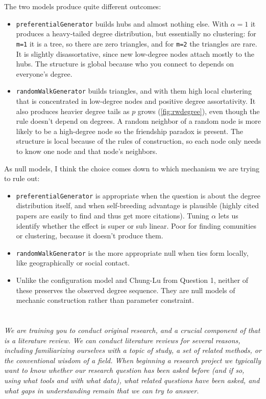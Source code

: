 \documentclass{article}
\begin{document}
\begin{enumerate}[label=(\roman*)]
    The two models produce quite different outcomes:
    \begin{itemize}
        \item \texttt{preferentialGenerator} builds hubs and almost nothing else. With $\alpha=1$ it produces a heavy-tailed degree distribution, but essentially no clustering: for \texttt{m=1} it is a tree, so there are zero triangles, and for \texttt{m=2} the triangles are rare. It is slightly disassortative, since new low-degree nodes attach mostly to the hubs. The structure is global because who you connect to depends on everyone's degree.
        \item \texttt{randomWalkGenerator} builds triangles, and with them high local clustering that is concentrated in low-degree nodes and positive degree assortativity. It also produces heavier degree tails as $p$ grows (\autoref{fig:rwdegree}), even though the rule doesn't depend on degrees. A random neighbor of a random node is more likely to be a high-degree node so the friendship paradox is present. The structure is local because of the rules of construction, so each node only needs to know one node and that node's neighbors.
    \end{itemize}

    As null models, I think the choice comes down to which mechanism we are trying to rule out:
    \begin{itemize}
        \item \texttt{preferentialGenerator} is appropriate when the question is about the degree distribution itself, and when self-breeding advantage is plausible (highly cited papers are easily to find and thus get more citations). Tuning $\alpha$ lets us identify whether the effect is super or sub linear. Poor for finding comunities or clustering, because it doesn't produce them.
        
        \item \texttt{randomWalkGenerator} is the more appropriate null when ties form locally, like geographically or social contact. 
        \item Unlike the configuration model and Chung-Lu from Question 1, neither of these preserves the observed degree sequence. They are null models of mechanic construction rather than parameter constraint. 
    \end{itemize}
\end{enumerate}

\clearpage
\section{}
\textit{We are training you to conduct original research, and a crucial component of that is a literature review. We can conduct literature reviews for several reasons, including familiarizing ourselves with a topic of study, a set of related methods, or the conventional wisdom of a field. When beginning a research project we typically want to know whether our research question has been asked before (and if so, using what tools and with what data), what related questions have been asked, and what gaps in understanding remain that we can try to answer.}
\end{document}
